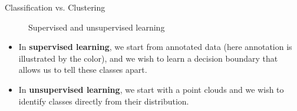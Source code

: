 \documentclass[xcolor=pdftex,dvipsnames,table]{beamer}
\begin{document}
\begin{frame}{Classification vs. Clustering}
	 \begin{figure}[htb]
   		\centering
   		 \hspace{1cm}
   		\caption{Supervised and unsupervised learning}
	 \end{figure}
	\begin{itemize}
		\item In {\bf supervised learning}, we start from annotated data (here annotation is illustrated by the color), and we wish to learn a decision boundary that allows us to tell these classes apart.
		\item In {\bf unsupervised learning}, we start with a point clouds and we wish to identify classes directly from their distribution.
	\end{itemize}
\end{frame}
\end{document}
